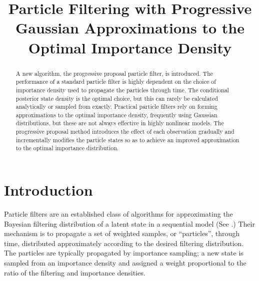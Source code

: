 \documentclass[conference]{IEEEtran}
\begin{document}
\title{Particle Filtering with Progressive Gaussian Approximations to the Optimal Importance Density}
\author{
\and
{}
}

\maketitle

\begin{abstract}
A new algorithm, the progressive proposal particle filter, is introduced. The performance of a standard particle filter is highly dependent on the choice of importance density used to propagate the particles through time. The conditional posterior state density is the optimal choice, but this can rarely be calculated analytically or sampled from exactly. Practical particle filters rely on forming approximations to the optimal importance density, frequently using Gaussian distributions, but these are not always effective in highly nonlinear models. The progressive proposal method introduces the effect of each observation gradually and incrementally modifies the particle states so as to achieve an improved approximation to the optimal importance distribution.
\end{abstract}


\IEEEpeerreviewmaketitle



\section{Introduction}

Particle filters are an established class of algorithms for approximating the Bayesian filtering distribution of a latent state in a sequential model (See \cite{Cappe2007,Doucet2009}.) Their mechanism is to propagate a set of weighted samples, or ``particles'', through time, distributed approximately according to the desired filtering distribution. The particles are typically propagated by importance sampling; a new state is sampled from an importance density and assigned a weight proportional to the ratio of the filtering and importance densities.
\end{document}
